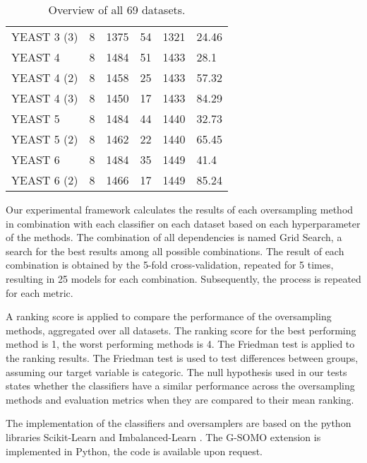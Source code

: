 \documentclass[parskip=full]{scrartcl}
\begin{document}
\begin{table} [H]
\begin{tabular}{ |p{4cm}||p{2.2cm}|p{2.2cm}|p{2.2cm}|p{2.2cm}|p{2.2cm}|  }
YEAST 3 (3)&	8&	1375&	54&	1321&	24.46\\
YEAST 4&	8&	1484&	51&	1433&	28.1\\
YEAST 4 (2)&	8&	1458&	25&	1433&	57.32\\
YEAST 4 (3)&	8&	1450&	17&	1433&	84.29\\
YEAST 5&	8&	1484&	44&	1440&	32.73\\
YEAST 5 (2)&	8&	1462&	22&	1440&	65.45\\
YEAST 6&	8&	1484&	35&	1449&	41.4\\
YEAST 6 (2)&	8&	1466&	17&	1449&	85.24\\

 \hline
\end{tabular}

\caption{Overview of all 69 datasets.}
   \label{tab:test}
\end{table} 



Our experimental framework calculates the results of each oversampling method in combination with each classifier on each dataset based on each hyperparameter of the methods. The combination of all dependencies is named Grid Search, a search for the best results among all possible combinations. The result of each combination is obtained by the 5-fold cross-validation, repeated for 5 times, resulting in 25 models for each combination. Subsequently, the process is repeated for each metric. 

A ranking score is applied to compare the performance of the oversampling methods, aggregated over all datasets. The ranking score for the best performing method is 1, the worst performing methods is 4. The Friedman test is applied to the ranking results. The Friedman test is used to test differences between groups, assuming our target variable is categoric. The null hypothesis used in our tests states whether the classifiers have a similar performance across the oversampling methods and evaluation metrics when they are compared to their mean ranking.

The implementation of the classifiers and oversamplers are based on the python libraries Scikit-Learn \cite{Pedregosa2012} and Imbalanced-Learn \cite{Lemaitre2016}. The G-SOMO extension is implemented in Python, the code is available upon request.
\end{document}
